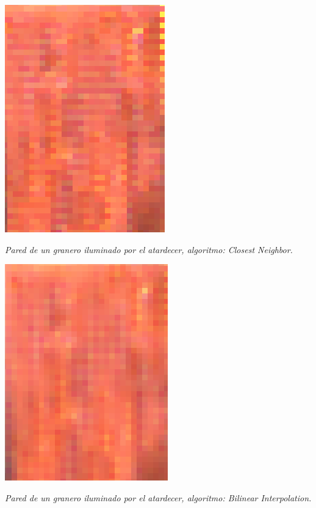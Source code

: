 \vspace{\baselineskip}

	\begin{center}
		\includegraphics[scale=.5]{../enunciado/images_files/cualitativo/farm_closest.png}
		\vspace{2pt}
		\par
		\footnotesize\textit{Pared de un granero iluminado por el atardecer, algoritmo: Closest Neighbor.}
	\end{center}


	\begin{center}
		\includegraphics[scale=.5]{../enunciado/images_files/cualitativo/farm_bilinear.png}
		\vspace{2pt}
		\par
		\footnotesize\textit{Pared de un granero iluminado por el atardecer, algoritmo: Bilinear Interpolation.}
	\end{center}


